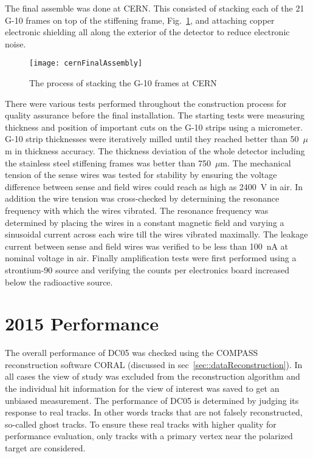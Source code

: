 The final assemble was done at CERN.  This consisted of stacking each of the 21
G-10 frames on top of the stiffening frame, Fig.~\ref{fig::cernFinalAssembly},
and attaching copper electronic shielding all along the exterior of the detector
to reduce electronic noise.

\begin{figure}[h!t]
  \centering \texttt{[image: cernFinalAssembly]}
  \caption{The process of stacking the G-10 frames at CERN}
  \label{fig::cernFinalAssembly}
\end{figure}

There were various tests performed throughout the construction process for
quality assurance before the final installation.  The starting tests were
measuring thickness and position of important cuts on the G-10 strips using a
micrometer.  G-10 strip thicknesses were iteratively milled until they reached
better than 50~$\mu$m in thickness accuracy.  The thickness deviation of the
whole detector including the stainless steel stiffening frames was better than
750~$\mu$m.  The mechanical tension of the sense wires was tested for stability
by ensuring the voltage difference between sense and field wires could reach as
high as 2400~V in air.  In addition the wire tension was cross-checked by
determining the resonance frequency with which the wires vibrated.  The
resonance frequency was determined by placing the wires in a constant magnetic
field and varying a sinusoidal current across each wire till the wires vibrated
maximally.  The leakage current between sense and field wires was verified to be
less than 100~nA at nominal voltage in air.  Finally amplification tests were
first performed using a strontium-90 source and verifying the counts per
electronics board increased below the radioactive source.


\section{2015 Performance}

The overall performance of DC05 was checked using the COMPASS reconstruction
software CORAL (discussed in sec~\ref{sec::dataReconstruction}).  In all cases
the view of study was excluded from the reconstruction algorithm and the
individual hit information for the view of interest was saved to get an unbiased
measurement.  The performance of DC05 is determined by judging its response to
real tracks.  In other words tracks that are not falsely reconstructed,
so-called ghost tracks.  To ensure these real tracks with higher quality for
performance evaluation, only tracks with a primary vertex near the polarized
target are considered.

